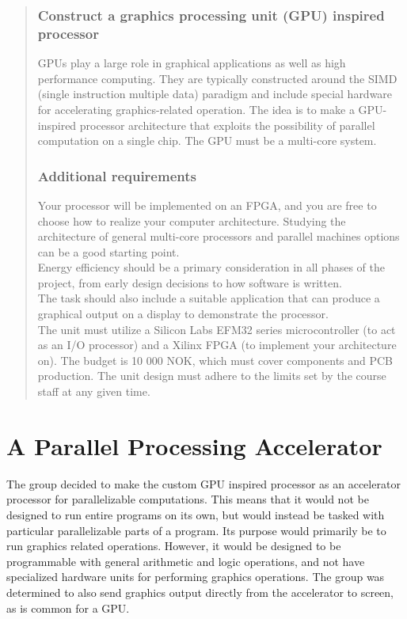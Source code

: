 \documentclass[../main/report.tex]{subfiles}
\begin{document}
\begin{quotation}

	\subsubsection{Construct a graphics processing unit (GPU) inspired processor}
    \noindent GPUs play a large role in graphical applications as well as high performance computing.
    They are typically constructed around the SIMD (single instruction multiple data) paradigm and
    include special hardware for accelerating graphics-related operation. The idea is to make a
    GPU-inspired processor architecture that exploits the possibility of parallel computation on a
    single chip. The GPU must be a multi-core system.
    
    \subsubsection{Additional requirements}
    \noindent Your processor will be implemented on an FPGA, and you are free to choose how to
    realize your computer architecture. Studying the architecture of general multi-core processors
    and parallel machines options can be a good starting point.\\
    
    \noindent Energy efficiency should be a primary consideration in all phases of the project, from early
    design decisions to how software is written.\\
    
    \noindent The task should also include a suitable application that can produce a graphical output on a
    display to demonstrate the processor.\\
    
    \noindent The unit must utilize a Silicon Labs EFM32 series microcontroller (to act as an I/O processor)
    and a Xilinx FPGA (to implement your architecture on). The budget is 10 000 NOK, which must
    cover components and PCB production. The unit design must adhere to the limits set by the
    course staff at any given time.
\end{quotation}
\newpage

\section{A Parallel Processing Accelerator}

The group decided to make the custom GPU inspired processor as an accelerator processor for parallelizable computations.
This means that it would not be designed to run entire programs on its own, but would instead be tasked with particular parallelizable parts of a program.
Its purpose would primarily be to run graphics related operations.
However, it would be designed to be programmable with general arithmetic and logic operations, and not have specialized hardware units for performing graphics operations.
The group was determined to also send graphics output directly from the accelerator to screen, as is common for a GPU.
\end{document}

